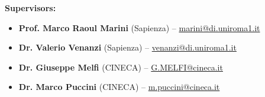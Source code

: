 \documentclass[a4paper,twoside]{sapthesis}
\begin{document}
\vspace{1cm}

\noindent
\textbf{Supervisors:}
\begin{itemize}
    \item \textbf{Prof. Marco Raoul Marini} (Sapienza) -- \href{mailto:marini@di.uniroma1.it}{marini@di.uniroma1.it}
    \item \textbf{Dr. Valerio Venanzi} (Sapienza) -- \href{mailto:venanzi@di.uniroma1.it}{venanzi@di.uniroma1.it}
    \item \textbf{Dr. Giuseppe Melfi} (CINECA) -- \href{mailto:G.MELFI@cineca.it}{G.MELFI@cineca.it}
    \item \textbf{Dr. Marco Puccini} (CINECA) -- \href{mailto:m.puccini@cineca.it}{m.puccini@cineca.it}
\end{itemize}

\vspace*{\fill}
\end{document}
